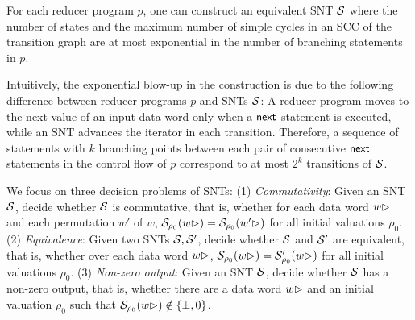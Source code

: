 

\begin{proposition}\label{prop-mrprog-to-snt}
For each reducer program $p$, one can construct an equivalent SNT ${\mathcal{S} }$ where the number of states and the maximum number of simple cycles in an SCC of the transition graph are at most exponential in the number of branching statements in $p$. 
\end{proposition}
Intuitively, the exponential blow-up in the construction is due to the following difference between reducer programs $p$ and SNTs ${\mathcal{S} }$: A reducer program moves to the next value of an input data word only when a $\mathsf{next}$ statement is executed, while an SNT advances the iterator in each transition. Therefore, a sequence of statements with $k$ branching points between each pair of consecutive $\mathsf{next}$ statements in the control flow of $p$ correspond to at most $2^k$ transitions of ${\mathcal{S} }$.



%
%
%

We focus on three decision problems of SNTs: (1) \emph{Commutativity}: Given an SNT ${\mathcal{S} }$, decide whether ${\mathcal{S} }$ is commutative, that is, whether for each data word $w\rhd$ and each permutation $w'$ of $w$, ${\mathcal{S} }_{\rho_0}(w\rhd)={\mathcal{S} }_{\rho_0}(w'\rhd)$ for all initial valuations $\rho_0$. (2) \emph{Equivalence}: Given two SNTs ${\mathcal{S} },{\mathcal{S} }'$, decide whether ${\mathcal{S} }$ and ${\mathcal{S} }'$ are equivalent, that is, whether over each data word $w\rhd$, ${\mathcal{S} }_{\rho_0}(w\rhd)={\mathcal{S} }'_{\rho_0}(w\rhd)$ for all initial valuations $\rho_0$. (3) \emph{Non-zero output}: Given an SNT ${\mathcal{S} }$, decide whether ${\mathcal{S} }$ has a non-zero output, that is, whether there are a data word $w\rhd$ and an initial valuation $\rho_0$ such that ${\mathcal{S} }_{\rho_0}(w\rhd)\notin \{\bot, 0\}$. 

